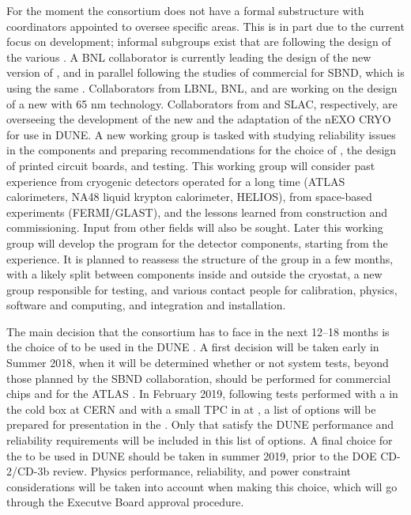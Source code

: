 For the moment the  consortium does not have a formal substructure
with coordinators appointed to oversee specific areas. This is in part due
to the current focus on  development; informal subgroups exist that
are following the design of the various . 
A BNL collaborator is currently leading the
design of the new version of , and in parallel following the studies
of commercial  for SBND, which is using the same .  
Collaborators from LBNL, BNL, and \fnal are working on the design of a new   with 65 nm technology. 
Collaborators from \fnal and SLAC, respectively, %
are overseeing the development of the new   and 
the adaptation of the nEXO CRYO  
for use in DUNE. 
A new working group is tasked with studying reliability 
issues in the  components and preparing recommendations for the choice
of , the design of printed circuit boards, and testing. This working group
will consider past experience from cryogenic detectors operated for a long
time (ATLAS \lar calorimeters, NA48 liquid krypton calorimeter, HELIOS),
from space-based experiments (FERMI/GLAST), and the lessons learned from
 construction and commissioning. Input from other fields will
also be sought. Later this working group will develop the  program for the  detector
components, starting from the  experience. It is planned to
reassess the structure of the group in a few months, with a likely split
between components inside and outside the cryostat, a new group responsible
for testing, and various contact people for calibration, physics, software and
computing, and integration and installation.
 
The main decision that the consortium has to face in the next \numrange{12}{18} months
is the choice of  to be used in the DUNE . A first decision will
be taken early in Summer 2018, when it will be determined whether or not system
tests, beyond those planned by the SBND collaboration, should be performed for 
commercial  chips and for the ATLAS . In February 2019, following tests
performed with a   in the cold box at CERN and with a small TPC in
\lar at \fnal, a list of options will be prepared for presentation in the .
Only  that satisfy the DUNE performance and reliability requirements
will be included in this list of options. A final choice for the  to
be used in DUNE should be taken in summer 2019, prior to the DOE CD-2/CD-3b
review. Physics performance, reliability, and power constraint considerations
will be taken into account when making this choice, which will go through
the Executve Board approval procedure.
